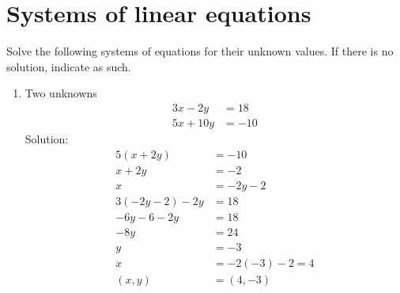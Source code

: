 \documentclass[12pt]{article}
\begin{document}
\section{Systems of linear equations}
Solve the following systems of equations for their unknown values. If there is no solution, indicate as
such.
\begin{enumerate}
    \item Two unknowns 
    \begin{align*}
        3x - 2y &= 18
        \\ 5x + 10y &= -10
    \end{align*}
    Solution:
    \begin{align*}
        5(x+2y) &= -10
       \\ x + 2y &= -2
       \\ x &= -2y-2
       \\ 3(-2y-2) -2y&= 18
       \\ -6y -6 -2y &= 18
       \\ -8y &= 24
       \\ y&= -3
       \\ x&= -2(-3)-2 = 4
       \\ (x,y) &= (4,-3)
    \end{align*}


\end{enumerate}
\end{document}
